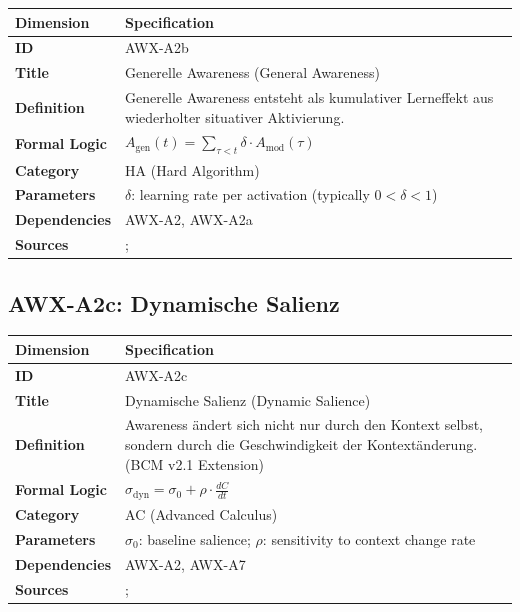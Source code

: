 \begin{table}[htbp]
\small
\begin{tabular}{p{3cm}p{11cm}}
\toprule
\textbf{Dimension} & \textbf{Specification} \\
\midrule
\textbf{ID} & AWX-A2b \\
\textbf{Title} & Generelle Awareness (General Awareness) \\
\textbf{Definition} & Generelle Awareness entsteht als kumulativer Lerneffekt aus wiederholter situativer Aktivierung. \\
\textbf{Formal Logic} & $A_{\text{gen}}(t) = \sum_{\tau < t} \delta \cdot A_{\text{mod}}(\tau)$ \\
\textbf{Category} & HA (Hard Algorithm) \\
\textbf{Parameters} & $\delta$: learning rate per activation (typically $0 < \delta < 1$) \\
\textbf{Dependencies} & AWX-A2, AWX-A2a \\
\textbf{Sources} & \citet{arrow1962learning}; \citet{kandori1993learning} \\
\bottomrule
\end{tabular}
\end{table}


\subsection{AWX-A2c: Dynamische Salienz}

\begin{table}[htbp]
\small
\begin{tabular}{p{3cm}p{11cm}}
\toprule
\textbf{Dimension} & \textbf{Specification} \\
\midrule
\textbf{ID} & AWX-A2c \\
\textbf{Title} & Dynamische Salienz (Dynamic Salience) \\
\textbf{Definition} & Awareness ändert sich nicht nur durch den Kontext selbst, sondern durch die Geschwindigkeit der Kontextänderung. (BCM v2.1 Extension) \\
\textbf{Formal Logic} & $\sigma_{\text{dyn}} = \sigma_0 + \rho \cdot \frac{dC}{dt}$ \\
\textbf{Category} & AC (Advanced Calculus) \\
\textbf{Parameters} & $\sigma_0$: baseline salience; $\rho$: sensitivity to context change rate \\
\textbf{Dependencies} & AWX-A2, AWX-A7 \\
\textbf{Sources} & \citet{bordalo2012salience}; \citet{bordalo2013salience} \\
\bottomrule
\end{tabular}
\end{table}

